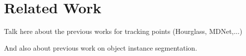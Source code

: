 
%
\newpage
\chapter{Related Work}



Talk here about the previous works for tracking points (Hourglass, MDNet,...)

And also about previous work on object instance segmentation.
